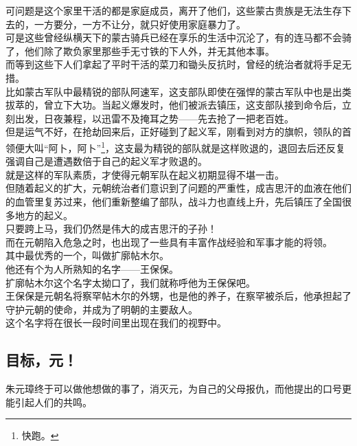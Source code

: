 \begin{multicols}{\theparacolNo}
可问题是这个家里干活的都是家庭成员，离开了他们，这些蒙古贵族是无法生存下去的，一方要分，一方不让分，就只好使用家庭暴力了。\\

可是这些曾经纵横天下的蒙古骑兵已经在享乐的生活中沉沦了，有的连马都不会骑了，他们除了欺负家里那些手无寸铁的下人外，并无其他本事。\\

而等到这些下人们拿起了平时干活的菜刀和锄头反抗时，曾经的统治者就将手足无措。\\

比如蒙古军队中最精锐的部队阿速军，这支部队即使在强悍的蒙古军队中也是出类拔萃的，曾立下大功。当起义爆发时，他们被派去镇压，这支部队接到命令后，立刻出发，日夜兼程，以迅雷不及掩耳之势——先去抢了一把老百姓。\\

但是运气不好，在抢劫回来后，正好碰到了起义军，刚看到对方的旗帜，领队的首领便大叫“阿卜，阿卜”\footnote{快跑。}，这支最为精锐的部队就是这样败退的，退回去后还反复强调自己是遭遇数倍于自己的起义军才败退的。\\

就是这样的军队素质，才使得元朝军队在起义初期显得不堪一击。\\

但随着起义的扩大，元朝统治者们意识到了问题的严重性，成吉思汗的血液在他们的血管里复苏过来，他们重新整编了部队，战斗力也直线上升，先后镇压了全国很多地方的起义。\\

只要跨上马，我们仍然是伟大的成吉思汗的子孙！\\

而在元朝陷入危急之时，也出现了一些具有丰富作战经验和军事才能的将领。\\

其中最优秀的一个，叫做扩廓帖木尔。\\

他还有个为人所熟知的名字——王保保。\\

扩廓帖木尔这个名字太拗口了，我们就称呼他为王保保吧。\\

王保保是元朝名将察罕帖木尔的外甥，也是他的养子，在察罕被杀后，他承担起了守护元朝的使命，并成为了明朝的主要敌人。\\

这个名字将在很长一段时间里出现在我们的视野中。\\

\subsection{目标，元！}
朱元璋终于可以做他想做的事了，消灭元，为自己的父母报仇，而他提出的口号更能引起人们的共鸣。\\


\end{multicols}
